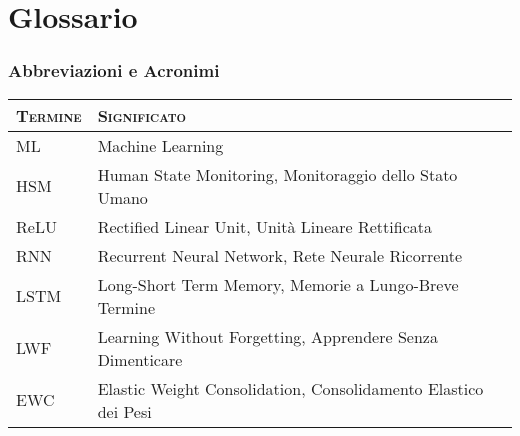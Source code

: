 \chapter*{Glossario}

\subsection*{Abbreviazioni e Acronimi}
\begin{table}[h!]
	\begin{center}
		\begin{tabularx}{\textwidth}{ll}
			\toprule
			\textsc{Termine} & \textsc{Significato} \\ 
			\midrule
			ML & Machine Learning\\
			HSM & Human State Monitoring, Monitoraggio dello Stato Umano\\
			ReLU & Rectified Linear Unit, Unità Lineare Rettificata\\
			RNN & Recurrent Neural Network, Rete Neurale Ricorrente\\
			LSTM & Long-Short Term Memory, Memorie a Lungo-Breve Termine\\
			LWF & Learning Without Forgetting, Apprendere Senza Dimenticare\\
			EWC & Elastic Weight Consolidation, Consolidamento Elastico dei Pesi\\
			\bottomrule
		\end{tabularx}
	\end{center}
\end{table}